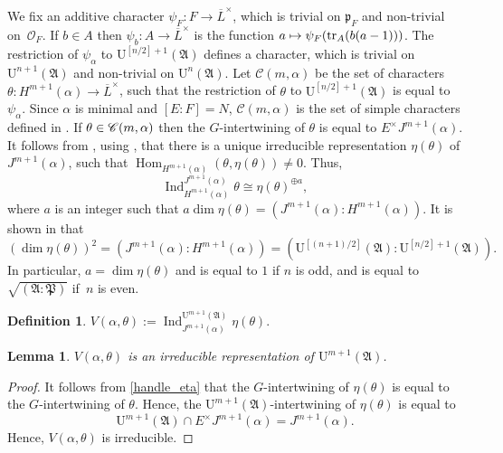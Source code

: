 \documentclass[JEP,XML,SOM,Unicode,NoEqCountersInSection]{cedram}
\let\mathcal\mathscr
\newcommand\mto{\mathchoice{\longmapsto}{\mapsto}{\mapsto}{\mapsto}}
\newtheorem{lem}[prop]{Lemma}
\theoremstyle{definition}
\newtheorem{defi}[prop]{Definition}
\DeclareMathOperator{\Hom}{Hom}
\DeclareMathOperator{\Ind}{Ind}
\DeclareMathOperator{\tr}{tr}
\newcommand{\Indu}[3]{\Ind_{#1}^{#2}{#3}}
\newcommand{\Aa}{\mathfrak A}
\newcommand{\Pp}{\mathfrak P}
\newcommand{\cO}{\mathcal{O}}
\newcommand{\pF}{\mathfrak{p}_F}
\newcommand{\UU}{\mathrm U}
\newcommand{\Lbar}{\overline{L}}
\begin{document}
We fix an additive character $\psi_F: F \to \Lbar^{\times}$, which is trivial on $\pF$ and non-trivial on~$\cO_F$. If $b\in A$ then $\psi_b: A\to \Lbar^{\times}$ is the function
$a\mto \psi_F(\tr_A(b(a-1)))$. The restriction of $\psi_{\alpha}$ to $\UU^{[n/2]+1}(\mathfrak A)$ defines a character, which is trivial on $\UU^{n+1}(\Aa)$ and non-trivial on $\UU^n(\Aa)$.
Let $\mathcal C(m, \alpha)$ be the set of characters \hbox{$\theta: H^{m+1}(\alpha)\to \Lbar^{\times}$}, such that the restriction of $\theta$ to $\UU^{[n/2]+1}(\mathfrak A)$ is equal to $\psi_{\alpha}$.
Since $\alpha$ is minimal and \hbox{$[E:F]=N$}, $\mathcal C(m, \alpha)$ is the set of simple characters defined in \cite[(3.2.1)]{BK}. If $\theta\in\nobreak \mathcal C(m, \alpha)$ then the $G$-intertwining of $\theta$ is
equal to $E^{\times} J^{m+1}(\alpha)$. It follows from \hbox{\cite[(8.3.3)]{BF}}, using \hbox{\cite[(3.4.1)]{BK}}, that there is a unique irreducible representation $\eta(\theta)$ of $J^{m+1}(\alpha)$, such that
$\Hom_{H^{m+1}(\alpha)}(\theta, \eta(\theta))\neq 0$. Thus,
\begin{equation}\label{handle_eta}
\Indu{H^{m+1}(\alpha)}{J^{m+1}(\alpha)}{\theta}\cong \eta(\theta)^{\oplus a},
\end{equation}
where $a$ is an integer such that $a \dim \eta(\theta)= (J^{m+1}(\alpha): H^{m+1}(\alpha))$. It is shown in \hbox{\cite[(8.3.3)]{BF}} that
\begin{equation}\label{dim_eta}
(\dim \eta(\theta))^2= (J^{m+1}(\alpha): H^{m+1}(\alpha))=(\UU^{[(n+1)/2]}(\Aa): \UU^{[n/2]+1}(\Aa)).
\end{equation}
In particular, $a=\dim \eta(\theta)$ and is equal to $1$ if $n$ is odd, and is equal to $\sqrt{(\Aa: \Pp)}$ if~$n$ is even.

\begin{defi}
$V(\alpha, \theta):=\Indu{J^{m+1}(\alpha)}{\UU^{m+1}(\Aa)}{\eta(\theta)}$.
\end{defi}

\begin{lem} $V(\alpha, \theta)$ is an irreducible representation of $\UU^{m+1}(\Aa)$.
\end{lem}

\begin{proof} It follows from \eqref{handle_eta} that the $G$-intertwining of $\eta(\theta)$ is equal to the $G$\nobreakdash-inter\-twining of $\theta$. Hence,
the $\UU^{m+1}(\Aa)$-intertwining of $\eta(\theta)$ is equal to
\[
\UU^{m+1}(\Aa)\cap E^{\times} J^{m+1}(\alpha)= J^{m+1}(\alpha).
\]
Hence,
$V(\alpha, \theta)$ is irreducible.
\end{proof}
\end{document}
